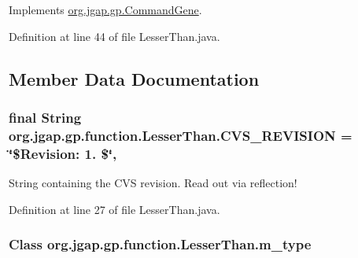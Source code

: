 Implements \hyperlink{classorg_1_1jgap_1_1gp_1_1_command_gene_a236141d99059da808afe7a9217e411c7}{org.\-jgap.\-gp.\-Command\-Gene}.



Definition at line 44 of file Lesser\-Than.\-java.



\subsection{Member Data Documentation}
\hypertarget{classorg_1_1jgap_1_1gp_1_1function_1_1_lesser_than_a2653a0785d9a8372cd6c0d754bff80a2}{
\subsubsection[{C\-V\-S\-\_\-\-R\-E\-V\-I\-S\-I\-O\-N}]{\setlength{\rightskip}{0pt plus 5cm}final String org.\-jgap.\-gp.\-function.\-Lesser\-Than.\-C\-V\-S\-\_\-\-R\-E\-V\-I\-S\-I\-O\-N = \char`\"{}\$Revision\-: 1. \$\char`\"{}\hspace{0.3cm}{\ttfamily [static]}, {\ttfamily [private]}}}\label{classorg_1_1jgap_1_1gp_1_1function_1_1_lesser_than_a2653a0785d9a8372cd6c0d754bff80a2}
String containing the C\-V\-S revision. Read out via reflection! 

Definition at line 27 of file Lesser\-Than.\-java.

\hypertarget{classorg_1_1jgap_1_1gp_1_1function_1_1_lesser_than_abd38f56dcea7da03736d935b48a48d75}{
\subsubsection[{m\-\_\-type}]{\setlength{\rightskip}{0pt plus 5cm}Class org.\-jgap.\-gp.\-function.\-Lesser\-Than.\-m\-\_\-type\hspace{0.3cm}{\ttfamily [private]}}}\label{classorg_1_1jgap_1_1gp_1_1function_1_1_lesser_than_abd38f56dcea7da03736d935b48a48d75}


